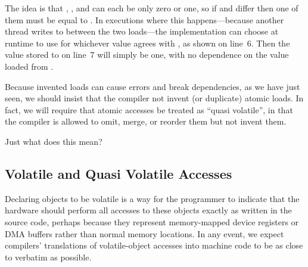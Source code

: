 The idea is that , , and  can each be only zero or one,
so if  and  differ then one of them must be equal to .
In executions where this happens---because another thread writes to 
between the two loads---the implementation can choose at runtime to use
for  whichever value agrees with , as shown on line~6.
Then the value stored to  on line~7 will simply be one,
with no dependence on the value loaded from .

Because invented loads can cause errors and break dependencies,
as we have just seen, we should insist that
the compiler not invent (or duplicate) atomic loads.
In fact, we will require that atomic accesses be treated as
``quasi volatile'', in that the compiler is allowed to omit,
merge, or reorder them but not invent them.

Just what does this mean?

\subsection{Volatile and Quasi Volatile Accesses}
\label{sec:Volatile and Quasi Volatile Accesses}

Declaring objects to be volatile is a way for the programmer to
indicate that the hardware should perform all accesses to these
objects exactly as written in the source code, perhaps because they
represent memory-mapped device registers or DMA buffers rather than
normal memory locations.
In any event, we expect compilers' translations of volatile-object accesses
into machine code to be as close to verbatim as possible.

